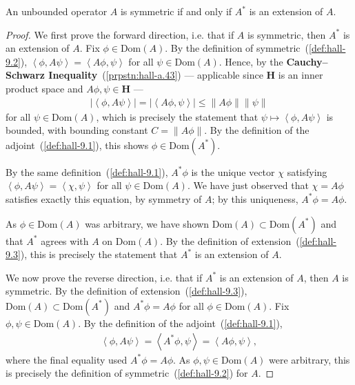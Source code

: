 \begin{proposition}
    \label{prpstn:hall-9.4}
    \leanok
    An unbounded operator $A$ is symmetric if and only if $A^*$ is an extension of $A$.
\end{proposition}
\begin{proof}
    \leanok
We first prove the forward direction, i.e. that if $A$ is symmetric, then $A^*$ is an extension of $A$. Fix $\phi \in \text{Dom}(A)$. By the definition of symmetric~(\ref{def:hall-9.2}), $\left< \phi, A\psi \right> = \left< A\phi, \psi \right>$ for all $\psi \in \text{Dom}(A)$. Hence, by the \textbf{Cauchy–Schwarz Inequality}~(\ref{prpstn:hall-a.43}) — applicable since $\mathbf{H}$ is an inner product space and $A\phi, \psi \in \mathbf{H}$ —
\begin{align}
    \lvert \left< \phi, A\psi \right> \rvert = \lvert \left< A\phi, \psi \right> \rvert \le \left\| A\phi \right\| \left\| \psi \right\|
\end{align}
for all $\psi \in \text{Dom}(A)$, which is precisely the statement that $\psi \mapsto \left< \phi, A\psi \right>$ is bounded, with bounding constant $C = \left\| A\phi \right\|$. By the definition of the adjoint~(\ref{def:hall-9.1}), this shows $\phi \in \text{Dom}(A^*)$.

By the same definition~(\ref{def:hall-9.1}), $A^*\phi$ is the unique vector $\chi$ satisfying $\left< \phi, A\psi \right> = \left< \chi, \psi \right>$ for all $\psi \in \text{Dom}(A)$. We have just observed that $\chi = A\phi$ satisfies exactly this equation, by symmetry of $A$; by this uniqueness, $A^*\phi = A\phi$.

As $\phi \in \text{Dom}(A)$ was arbitrary, we have shown $\text{Dom}(A) \subset \text{Dom}(A^*)$ and that $A^*$ agrees with $A$ on $\text{Dom}(A)$. By the definition of extension~(\ref{def:hall-9.3}), this is precisely the statement that $A^*$ is an extension of $A$.

We now prove the reverse direction, i.e. that if $A^*$ is an extension of $A$, then $A$ is symmetric. By the definition of extension~(\ref{def:hall-9.3}), $\text{Dom}(A) \subset \text{Dom}(A^*)$ and $A^*\phi = A\phi$ for all $\phi \in \text{Dom}(A)$. Fix $\phi, \psi \in \text{Dom}(A)$. By the definition of the adjoint~(\ref{def:hall-9.1}),
\begin{align}
    \left< \phi, A\psi \right> = \left< A^*\phi, \psi \right> = \left< A\phi, \psi \right>,
\end{align}
where the final equality used $A^*\phi = A\phi$. As $\phi, \psi \in \text{Dom}(A)$ were arbitrary, this is precisely the definition of symmetric~(\ref{def:hall-9.2}) for $A$.
\end{proof}

